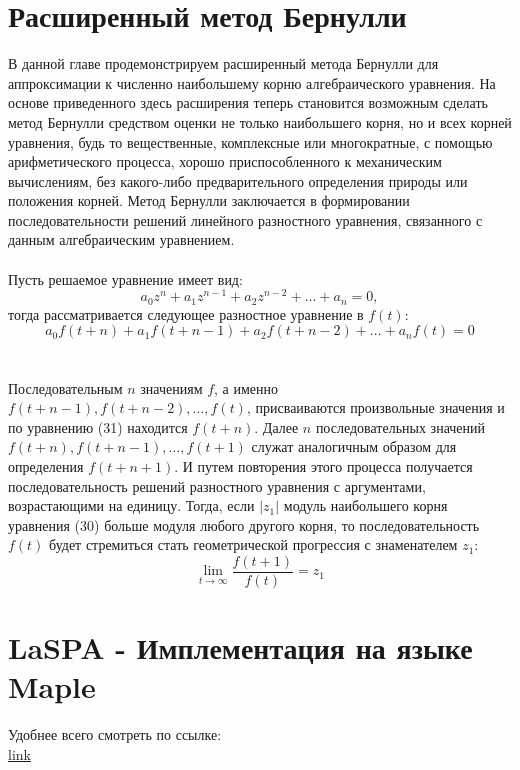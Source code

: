 \documentclass[a4paper,12pt]{article}
\begin{document}
\section{Расширенный метод Бернулли}
В данной главе продемонстрируем расширенный метода Бернулли для
аппроксимации к численно наибольшему корню алгебраического уравнения. На основе приведенного здесь расширения теперь становится возможным сделать
метод Бернулли средством оценки не только наибольшего корня, но и
всех корней уравнения, будь то вещественные, комплексные или многократные, с помощью
арифметического процесса, хорошо приспособленного к механическим вычислениям, без
какого-либо предварительного определения природы или положения корней. Метод Бернулли заключается в формировании последовательности решений
линейного разностного уравнения, связанного с данным алгебраическим уравнением.
\\\\
Пусть решаемое уравнение имеет вид:
\begin{equation}
    a_0z^n+a_1z^{n-1}+a_2z^{n-2}+\dots + a_n=0,
\end{equation}
тогда рассматривается следующее разностное уравнение в $f(t)$:
\begin{equation}
    a_0f(t+n)+a_1f(t+n-1)+a_2f(t+n-2)+\dots+a_nf(t)=0
\end{equation}
\\\\
Последовательным $n$ значениям $f$, а именно $f(t + n-1), f(t + n-2),\dots, f(t)$, присваиваются произвольные значения и по уравнению (31) находится $f(t + n)$. Далее $n$ последовательных значений $f(t+n), f(t+n-1), \dots, f(t+1)$ служат аналогичным образом для определения $f(t+n+1).$ И путем повторения этого процесса получается последовательность решений разностного уравнения с аргументами, возрастающими на единицу. Тогда, если $|z_1|$ модуль наибольшего корня уравнения (30) больше модуля любого другого корня, то последовательность $f(t)$ будет стремиться стать геометрической прогрессия с знаменателем $z_1$:
\[\lim_{t\rightarrow\infty}\frac{f(t+1)}{f(t)}=z_1\]
\section{LaSPA - Имплементация на языке Maple}
Удобнее всего смотреть по ссылке: \\
\href{https://www.researchgate.net/profile/Herbert-Moeller/publication/259333181_Visualization_of_the_First_Stage_of_the_SPA/links/0046352b099ed53856000000/Visualization-of-the-First-Stage-of-the-SPA.pdf}{link}
\newpage
\end{document}
